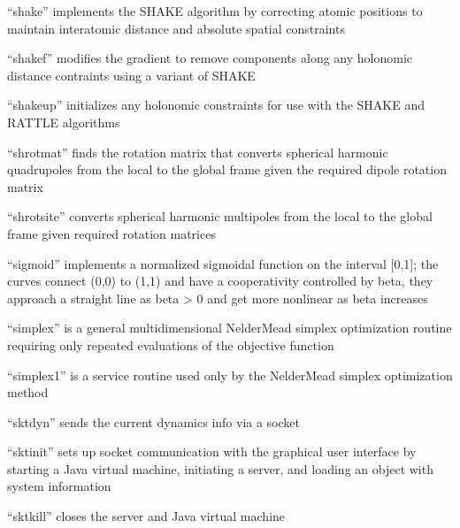 \documentclass[letterpaper,11pt,english]{sphinxmanual}
\begin{document}
“shake” implements the SHAKE algorithm by correcting atomic
positions to maintain interatomic distance and absolute spatial
constraints


“shakef” modifies the gradient to remove components along any
holonomic distance contraints using a variant of SHAKE


“shakeup” initializes any holonomic constraints for use with
the SHAKE and RATTLE algorithms


“shrotmat” finds the rotation matrix that converts spherical
harmonic quadrupoles from the local to the global frame given
the required dipole rotation matrix


“shrotsite” converts spherical harmonic multipoles from the
local to the global frame given required rotation matrices


“sigmoid” implements a normalized sigmoidal function on the
interval {[}0,1{]}; the curves connect (0,0) to (1,1) and have
a cooperativity controlled by beta, they approach a straight
line as beta \sphinxhyphen{}\textgreater{} 0 and get more nonlinear as beta increases


“simplex” is a general multidimensional Nelder\sphinxhyphen{}Mead simplex
optimization routine requiring only repeated evaluations of
the objective function


“simplex1” is a service routine used only by the Nelder\sphinxhyphen{}Mead
simplex optimization method


“sktdyn” sends the current dynamics info via a socket


“sktinit” sets up socket communication with the graphical
user interface by starting a Java virtual machine, initiating
a server, and loading an object with system information


“sktkill” closes the server and Java virtual machine
\end{document}
